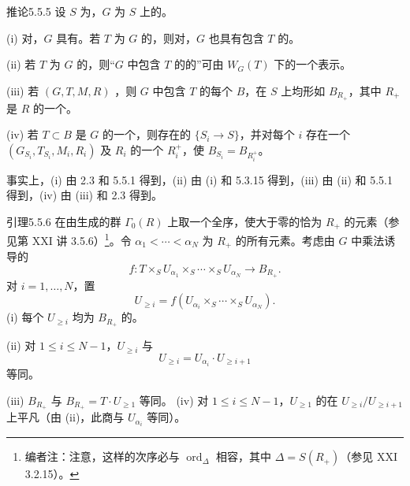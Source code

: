 \begin{SGAresult}{推论}{5.5.5}
设 $S$ 为，$G$ 为 $S$ 上的。

(i) 对，$G$ 具有。若 $T$ 为 $G$ 的，则对，$G$ 也具有包含 $T$ 的。

(ii) 若 $T$ 为 $G$ 的，则“$G$ 中包含 $T$ 的的”可由 $W_G(T)$ 下的一个表示。

(iii) 若 $(G,T,M,R)$ ，则 $G$ 中包含 $T$ 的每个 $B$，在 $S$ 上均形如 $B_{R_+}$，其中 $R_+$ 是 $R$ 的一个。

(iv) 若 $T\subset B$ 是 $G$ 的一个，则存在的 $\{S_i\to S\}$，并对每个 $i$ 存在一个 $(G_{S_i},T_{S_i},M_i,R_i)$ 及 $R_i$ 的一个 $R_i^+$，使 $B_{S_i}=B_{R_i^+}$。
\end{SGAresult}
事实上，(i) 由 2.3 和 5.5.1 得到，(ii) 由 (i) 和 5.3.15 得到，(iii) 由 (ii) 和 5.5.1 得到，(iv) 由 (iii) 和 2.3 得到。
\begin{SGAresult}{引理}{5.5.6}
在由生成的群 $\Gamma_0(R)$ 上取一个全序，使大于零的恰为 $R_+$ 的元素（参见第 XXI 讲 3.5.6）\footnote{编者注：注意，这样的次序必与 $\operatorname{ord}_\Delta$ 相容，其中 $\Delta=S(R_+)$（参见 XXI 3.2.15）。}。令 $\alpha_1<\cdots<\alpha_N$ 为 $R_+$ 的所有元素。考虑由 $G$ 中乘法诱导的
\[f:T\times_SU_{\alpha_1}\times_S\cdots\times_SU_{\alpha_N}\longrightarrow B_{R_+}.\]
对 $i=1,\ldots,N$，置
\[U_{\ge i}=f(U_{\alpha_i}\times_S\cdots\times_SU_{\alpha_N}).\]
(i) 每个 $U_{\ge i}$ 均为 $B_{R_+}$ 的。

(ii) 对 $1\le i\le N-1$，$U_{\ge i}$ 与
\[U_{\ge i}=U_{\alpha_i}\cdot U_{\ge i+1}\]
等同。

(iii) $B_{R_+}$ 与 $B_{R_+}=T\cdot U_{\ge1}$ 等同。
(iv) 对 $1\le i\le N-1$，$U_{\ge1}$ 的在 $U_{\ge i}/U_{\ge i+1}$ 上平凡（由 (ii)，此商与 $U_{\alpha_i}$ 等同）。
\end{SGAresult}
